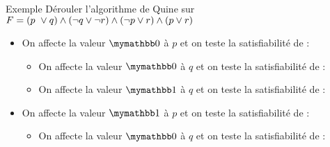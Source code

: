 \documentclass[10pt]{beamer}
\begin{document}
\begin{frame}{\Ctitle}{\stitle}
    \begin{exampleblock}{Exemple}
        Dérouler l'algorithme de Quine sur $F = (p\ \vee q) \wedge (\neg q \vee \neg r) \wedge (\neg p \vee r) \wedge (p \vee r)$
        \begin{itemize}
            \item On affecte la valeur  $\faux$ à $p$ et on teste la satisfiabilité de : \\
            \begin{itemize} 
                \item<5-> On affecte la valeur  $\faux$ à $q$ et on teste la satisfiabilité de : \\
                \item<7-> On affecte la valeur  $\vrai$ à $q$ et on teste la satisfiabilité de : \\
            \end{itemize}
            \item<9-> On affecte la valeur  $\vrai$ à $p$ et on teste la satisfiabilité de : \\
            \begin{itemize} 
                \item<12-> On affecte la valeur  $\faux$ à $q$ et on teste la satisfiabilité de : \\
            \end{itemize}
        \end{itemize}
    \end{exampleblock}

\end{frame}
\end{document}
